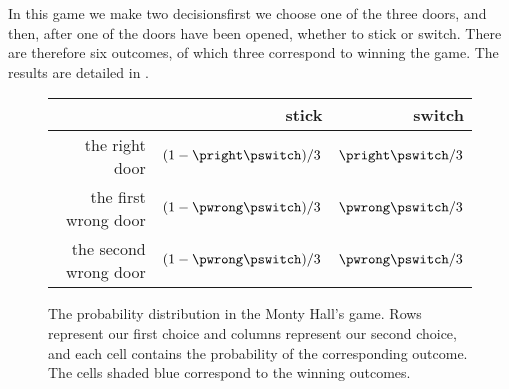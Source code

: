 In this game we make two decisions\dash first we choose one of the three doors, and then, after one of the doors have been opened, whether to stick or switch.
There are therefore six outcomes, of which three correspond to winning the game.
The results are detailed in .
\begin{figure}[htb]
    \renewcommand{\arraystretch}{1.2}
    \begin{tabular}{r|r|r|}
        & stick & switch \\
        \hline
        the right door & \cellcolor{lightblue}$(1-\pright\pswitch)/3$ & $\pright\pswitch/3$ \\
        \hline
        the first wrong door & $(1-\pwrong\pswitch)/3$ & \cellcolor{lightblue}$\pwrong\pswitch/3$ \\
        \hline
        the second wrong door & $(1-\pwrong\pswitch)/3$ & \cellcolor{lightblue}$\pwrong\pswitch/3$ \\
        \hline
    \end{tabular}
    \caption{The probability distribution in the Monty Hall's game.
    Rows represent our first choice and columns represent our second choice, and each cell contains the probability of the corresponding outcome.
    The cells shaded blue correspond to the winning outcomes.} \label{fig:C-1b}
\end{figure}
